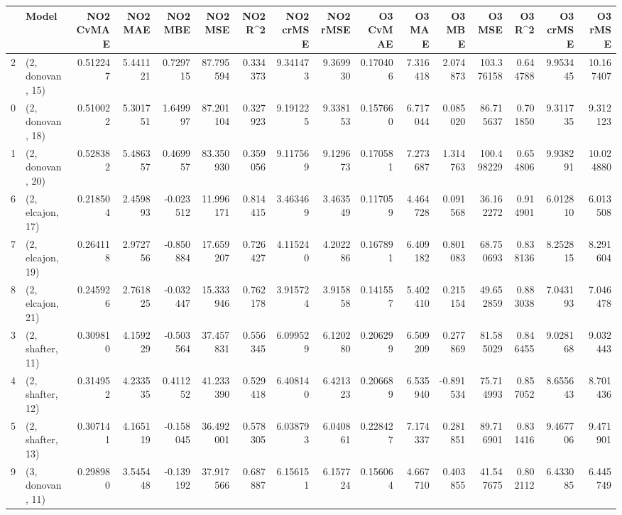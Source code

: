 \begin{tabular}{llrrrrrrrrrrrrrr}
\toprule
{} &             Model &  NO2 CvMAE &   NO2 MAE &   NO2 MBE &    NO2 MSE &   NO2 R\textasciicircum2 &  NO2 crMSE &  NO2 rMSE &  O3 CvMAE &     O3 MAE &    O3 MBE &      O3 MSE &    O3 R\textasciicircum2 &   O3 crMSE &    O3 rMSE \\
\midrule
2  &  (2, donovan, 15) &   0.512247 &  5.441121 &  0.729715 &  87.795594 &  0.334373 &   9.341473 &  9.369930 &  0.170406 &   7.316418 &  2.074873 &  103.376158 &  0.644788 &   9.953445 &  10.167407 \\
0  &  (2, donovan, 18) &   0.510022 &  5.301751 &  1.649997 &  87.201104 &  0.327923 &   9.191225 &  9.338153 &  0.157660 &   6.717044 &  0.085020 &   86.715637 &  0.701850 &   9.311735 &   9.312123 \\
1  &  (2, donovan, 20) &   0.528382 &  5.486357 &  0.469957 &  83.350930 &  0.359056 &   9.117569 &  9.129673 &  0.170581 &   7.273687 &  1.314763 &  100.498229 &  0.654806 &   9.938291 &  10.024880 \\
6  &  (2, elcajon, 17) &   0.218504 &  2.459893 & -0.023512 &  11.996171 &  0.814415 &   3.463469 &  3.463549 &  0.117059 &   4.464728 &  0.091568 &   36.162272 &  0.914901 &   6.012810 &   6.013508 \\
7  &  (2, elcajon, 19) &   0.264118 &  2.972756 & -0.850884 &  17.659207 &  0.726427 &   4.115240 &  4.202286 &  0.167891 &   6.409182 &  0.801083 &   68.750693 &  0.838136 &   8.252815 &   8.291604 \\
8  &  (2, elcajon, 21) &   0.245926 &  2.761825 & -0.032447 &  15.333946 &  0.762178 &   3.915724 &  3.915858 &  0.141557 &   5.402410 &  0.215154 &   49.652859 &  0.883038 &   7.043193 &   7.046478 \\
3  &  (2, shafter, 11) &   0.309810 &  4.159229 & -0.503564 &  37.457831 &  0.556345 &   6.099529 &  6.120280 &  0.206299 &   6.509209 &  0.277869 &   81.585029 &  0.846455 &   9.028168 &   9.032443 \\
4  &  (2, shafter, 12) &   0.314952 &  4.233535 &  0.411252 &  41.233390 &  0.529418 &   6.408140 &  6.421323 &  0.206689 &   6.535940 & -0.891534 &   75.714993 &  0.857052 &   8.655643 &   8.701436 \\
5  &  (2, shafter, 13) &   0.307141 &  4.165119 & -0.158045 &  36.492001 &  0.578305 &   6.038793 &  6.040861 &  0.228427 &   7.174337 &  0.281851 &   89.716901 &  0.831416 &   9.467706 &   9.471901 \\
9  &  (3, donovan, 11) &   0.298980 &  3.545448 & -0.139192 &  37.917566 &  0.687887 &   6.156151 &  6.157724 &  0.156064 &   4.667710 &  0.403855 &   41.547675 &  0.802112 &   6.433085 &   6.445749 \\

\end{tabular}
